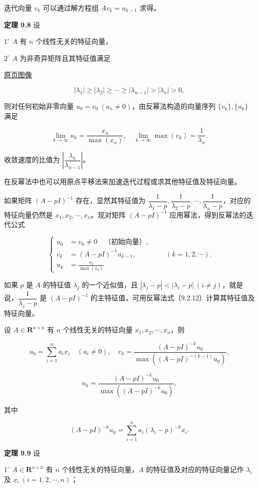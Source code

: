 \documentclass[
  10pt,
  fontset=fandol]{ctexart}
\begin{document}
迭代向量 \(v_k\) 可以通过解方程组 \(Av_k=u_{k-1}\) 求得。

\textbf{定理 9.8} 设

\(1^\circ\) \(A\) 有 \(n\) 个线性无关的特征向量，

\(2^\circ\) \(A\) 为非奇异矩阵且其特征值满足

\href{../../source-images/pdf-241.jpeg}{原页图像}

\[
|\lambda_1|\geq|\lambda_2|\geq\cdots\geq|\lambda_{n-1}|>|\lambda_n|>0,
\]

则对任何初始非零向量 \(u_0=v_0\ (a_n\ne0)\)，由反幂法构造的向量序列 \(\{v_k\},\{u_k\}\) 满足

\[
\lim_{k\to\infty}u_k=\frac{x_n}{\max(x_n)},\quad\lim_{k\to\infty}\max(v_k)=\frac1{\lambda_n}.
\]

收敛速度的比值为 \(\left|\dfrac{\lambda_n}{\lambda_{n-1}}\right|\)。

在反幂法中也可以用原点平移法来加速迭代过程或求其他特征值及特征向量。

如果矩阵 \((A-pI)^{-1}\) 存在，显然其特征值为 \(\dfrac1{\lambda_1-p},\dfrac1{\lambda_2-p},\cdots,\dfrac1{\lambda_n-p}\)，对应的特征向量仍然是 \(x_1,x_2,\cdots,x_n\)。现对矩阵 \((A-pI)^{-1}\) 应用幂法，得到反幂法的迭代公式

\[
\left\{
\begin{aligned}
u_0&=v_0\ne0\quad\text{（初始向量）},\\
v_k&=(A-pI)^{-1}u_{k-1},\\
u_k&=\frac{v_k}{\max(v_k)}
\end{aligned}
\right.\qquad(k=1,2,\cdots).
\tag{9.2.12}
\]

如果 \(p\) 是 \(A\) 的特征值 \(\lambda_j\) 的一个近似值，且 \(|\lambda_j-p|<|\lambda_i-p|\ (i\ne j)\)，就是说，\(\dfrac1{\lambda_j-p}\) 是 \((A-pI)^{-1}\) 的主特征值，可用反幂法式（9.2.12）计算其特征值及特征向量。

设 \(A\in\mathbf R^{n\times n}\) 有 \(n\) 个线性无关的特征向量 \(x_1,x_2,\cdots,x_n\)，则

\[
u_0=\sum_{i=1}^na_ix_i\quad(a_i\ne0),\quad
v_k=\frac{(A-pI)^{-k}u_0}{\max((A-pI)^{-(k-1)}u_0)},
\]

\[
u_k=\frac{(A-pI)^{-k}u_0}{\max((A-pI)^{-k}u_0)},
\]

其中

\[
(A-pI)^{-k}u_0=\sum_{i=1}^na_i(\lambda_i-p)^{-k}x_i.
\]

\textbf{定理 9.9} 设

\(1^\circ\) \(A\in\mathbf R^{n\times n}\) 有 \(n\) 个线性无关的特征向量，\(A\) 的特征值及对应的特征向量记作 \(\lambda_i\) 及 \(x_i\ (i=1,2,\cdots,n)\)；
\end{document}
